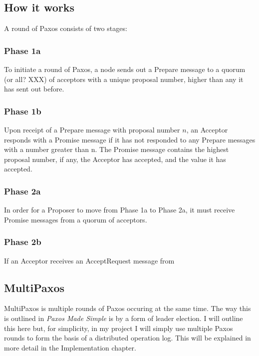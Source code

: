 \documentclass[12pt,twoside,notitlepage]{report}
\begin{document}
\subsection{How it works}

A round of Paxos consists of two stages:

\subsubsection*{Phase 1a}

To initiate a round of Paxos, a node sends out a Prepare message to a quorum (or all? XXX) of
acceptors with a unique proposal number, higher than any it has sent out before.

\subsubsection*{Phase 1b}

Upon receipt of a Prepare message with proposal number $n$, an Acceptor responds with a Promise
message if it has not responded to any Prepare messages with a number greater than n. The Promise
message contains the highest proposal number, if any, the Acceptor has accepted, and the value it
has accepted.

\subsubsection*{Phase 2a}

In order for a Proposer to move from Phase 1a to Phase 2a, it must receive Promise messages from a
quorum of acceptors.

\subsubsection*{Phase 2b}

If an Acceptor receives an AcceptRequest message from 

\subsection{MultiPaxos}

MultiPaxos is multiple rounds of Paxos occuring at the same time. The way this is outlined in
\emph{Paxos Made Simple} is by a form of leader election. I will outline this here but, for
simplicity, in my project I will simply use multiple Paxos rounds to form the basis of a
distributed operation log. This will be explained in more detail in the Implementation chapter.
\end{document}
